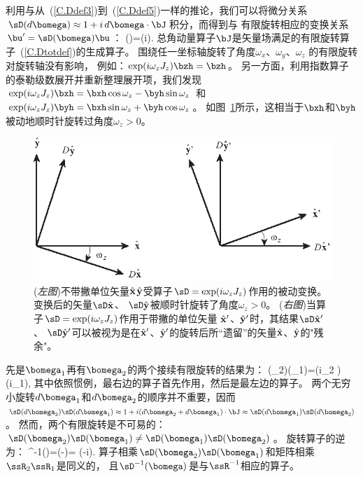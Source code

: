 利用与从~(\ref{C.Ddef3})到~(\ref{C.Ddef5})一样的推论，我们可以将微分关系$\sD(d\bomega)\approx 1+i\,d\/\bomega\cdot\bJ$积分，而得到与
有限旋转相应的变换关系$\bu'=\sD(\bomega)\bu$：
\eq \label{C.Dtotdef}
\sD(\bomega)=\exp(i\bomega\cdot\bJ).
\en
总角动量算子$\bJ$是矢量场满足的有限旋转算子~(\ref{C.Dtotdef})的生成算子。
%
%
围绕任一坐标轴旋转了角度$\omega_x$、$\omega_y$、$\omega_z$ 的有限旋转对旋转轴没有影响，
例如：$\exp(i\omega_zJ_z)\bzh=\bzh$。
另一方面，利用指数算子的泰勒级数展开并重新整理展开项，我们发现
$\exp(i\omega_zJ_z)\bxh=\bxh\cos\omega_z-\byh\sin\omega_z$
和$\exp(i\omega_zJ_z)\byh=\bxh\sin\omega_z+\byh\cos\omega_z$。
如图~\ref{C.fig.lastun}所示，这相当于$\bxh$和$\byh$ 被动地顺时针旋转过角度$\omega_z>0$。 
\begin{figure}[!t]
\begin{center}
\includegraphics{../figures/appendixC/fig02.eps}
\end{center}
\caption[Last Figure]{\label{C.fig.lastun}
({\em 左图\/})不带撇单位矢量$\hat{\bf x}$$\hat{\bf y}$受算子$\sD=\exp(i\omega_zJ_z)$作用的被动变换。
变换后的矢量$\sD\hat{\bf x}$、
$\sD\hat{\bf y}$被顺时针旋转了角度$\omega_z>0$。
({\em 右图\/})当算子$\sD=\exp(i\omega_zJ_z)$作用于带撇的单位矢量
$\hat{\bf x}'$、$\hat{\bf y}'$时，其结果$\sD\hat{\bf x}'$、
$\sD\hat{\bf y}'$可以被视为是在$\hat{\bf x}'$、$\hat{\bf y}'$的旋转后所“遗留”的矢量$\hat{\bf x}$、$\hat{\bf y}$的"残余"。}
\end{figure}

先是$\bomega_1$再有$\bomega_2$的两个接续有限旋转的结果为：
\eq \label{C.tworots}
\sD(\bomega_2)\sD(\bomega_1)=\exp(i\bomega_2
\cdot\bJ)\exp(i\bomega_1\cdot\bJ),
\en
其中依照惯例，最右边的算子首先作用，然后是最左边的算子。
两个无穷小旋转$d\bomega_1$和$d\bomega_2$的顺序并不重要，因而 $\sD(d\bomega_2)\sD(d\bomega_1)\approx
1+i(d\bomega_2+d\bomega_1)\cdot\bJ\approx
\sD(d\bomega_1)\sD(d\bomega_2)$。
然而，两个有限旋转是不可易的：$\sD(\bomega_2)\sD(\bomega_1)
\neq \sD(\bomega_1)\sD(\bomega_2)$。
旋转算子的逆为：
\eq \label{C.Dinvdef}
\sD^{-1}(\bomega)=\sD(-\bomega)=
\exp(-i\bomega\cdot\bJ).
\en
算子相乘$\sD(\bomega_2)\sD(\bomega_1)$和矩阵相乘 $\ssR_2\ssR_1$是同义的，
且$\sD^{-1}(\bomega)$是与$\ssR^{-1}$相应的算子。

